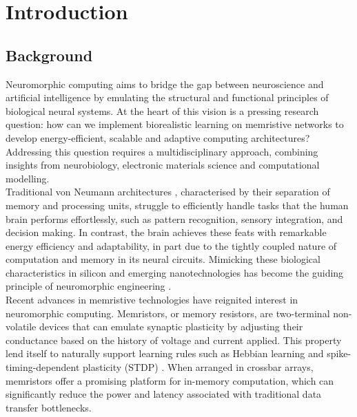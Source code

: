 
\chapter{Introduction}  %


\section[Background]{Background}

Neuromorphic computing aims to bridge the gap between neuroscience and artificial intelligence by emulating the structural and functional principles of biological neural systems. At the heart of this vision is a pressing research question: how can we implement biorealistic learning on memristive networks to develop energy-efficient, scalable and adaptive computing architectures? Addressing this question requires a multidisciplinary approach, combining insights from neurobiology, electronic materials science and computational modelling. \\

\noindent Traditional von Neumann architectures \cite{von1993first}, characterised by their separation of memory and processing units, struggle to efficiently handle tasks that the human brain performs effortlessly, such as pattern recognition, sensory integration, and decision making. In contrast, the brain achieves these feats with remarkable energy efficiency and adaptability, in part due to the tightly coupled nature of computation and memory in its neural circuits. Mimicking these biological characteristics in silicon and emerging nanotechnologies has become the guiding principle of neuromorphic engineering \cite{saighi2015plasticity}. \\

\noindent Recent advances in memristive technologies have reignited interest in neuromorphic computing. Memristors, or memory resistors, are two-terminal non-volatile devices that can emulate synaptic plasticity by adjusting their conductance based on the history of voltage and current applied. This property lend itself to naturally support learning rules such as Hebbian learning \cite{hebb2005organization} and spike-timing-dependent plasticity (STDP) \cite{markram1997regulation}. When arranged in crossbar arrays, memristors offer a promising platform for in-memory computation, which can significantly reduce the power and latency associated with traditional data transfer bottlenecks. \\

